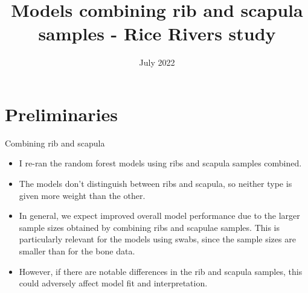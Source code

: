 \documentclass{beamer}
\title[]{Models combining rib and scapula samples - Rice Rivers study}
\date{July 2022}
\begin{document}
\begin{frame}
   \titlepage
\end{frame}









\section{Preliminaries}

\begin{frame}{Combining rib and scapula}

  \begin{itemize}
    \item I re-ran the random forest models using ribs and scapula samples combined.
    \item The models don't distinguish between ribs and scapula, so neither type
   is given more weight than the other.
    \item In general, we expect improved overall model performance due to the
    larger sample sizes obtained by combining ribs and scapulae samples.  This
    is particularly relevant for the models using swabs, since the sample sizes
    are smaller than for the bone data.
    \item However, if there are notable differences in the rib and scapula
    samples, this could adversely affect model fit and interpretation.
  \end{itemize}

\end{frame}
\end{document}
